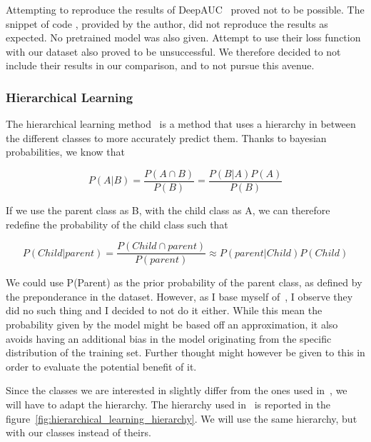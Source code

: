 \documentclass[11pt]{article}
\begin{document}
            Attempting to reproduce the results of DeepAUC~\cite{DeepAUC} proved not to be possible. The snippet of code , provided by the author,
            did not reproduce the results as expected. No pretrained model was also given. Attempt to use their loss function with our dataset also proved
            to be unsuccessful. We therefore decided to not include their results in our comparison, and to not pursue this avenue.



        \subsubsection{Hierarchical Learning}

            The hierarchical learning method~\cite{hierarchical} is a method that uses a hierarchy in between the different classes
            to more accurately predict them. Thanks to bayesian probabilities, we know that

            \begin{equation}
                P(A|B) = \frac{P(A \cap B)}{P(B)} = \frac{P(B|A) P(A)}{P(B)}
            \end{equation}

            If we use the parent class as B, with the child class as A, we can therefore redefine
            the probability of the child class such that

            \begin{equation}
                P(Child|parent) = \frac{P(Child \cap parent)}{P(parent)} \approx P(parent|Child) P(Child)
            \end{equation}

            We could use P(Parent) as the prior probability of the parent class, as defined by the preponderance in the dataset. However, as I base myself of~\cite{hierarchical}, I observe they did no such thing and I decided to not do it either. While this mean the probability given by the model might be based off an approximation,
            it also avoids having an additional bias in the model originating from the specific distribution of the training set. Further thought might however be given to this in order to evaluate the potential benefit of it.

            Since the classes we are interested in slightly differ from the ones used in~\cite{hierarchical},
            we will have to adapt the hierarchy. The hierarchy used in~\cite{hierarchical} is reported in the figure~\ref{fig:hierarchical_learning_hierarchy}. We will use the same hierarchy, but with our classes instead of theirs.
\end{document}
